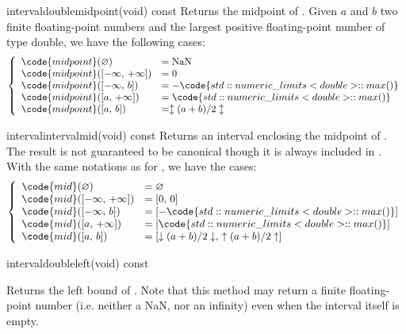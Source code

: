 \documentclass{manual}
\newcommand{\itv}[2]{\ensuremath{[#1,\,#2]}}
\newcommand{\roundDn}[1]{\ensuremath{\downarrow#1\downarrow}}
\newcommand{\roundUp}[1]{\ensuremath{\uparrow#1\uparrow}}
\newcommand{\roundNearest}[1]{\ensuremath{\updownarrow#1\updownarrow}}
\let\emptyset=\varnothing
\begin{document}
\begin{defmethod}{interval}{double}{midpoint}{(void) const}
  Returns the midpoint of . Given $a$ and $b$ two finite
  floating-point numbers and  the largest positive
  floating-point number of type double, we have the following cases:
\begin{equation*}
\left\{\begin{array}{ll}
\code{midpoint}(\emptyset{})&=\text{NaN}\\
\code{midpoint}(\itv{-\infty}{+\infty})&=0\\
\code{midpoint}(\itv{-\infty}{b})&=-\code{std::numeric\_limits<double>::max()}\\
\code{midpoint}(\itv{a}{+\infty})&=\code{std::numeric\_limits<double>::max()}\\
\code{midpoint}(\itv{a}{b})&=\roundNearest{(a+b)/2} \\
\end{array}\right.
\end{equation*}
\end{defmethod}

\begin{defmethod}{interval}{interval}{mid}{(void) const}
  Returns an interval enclosing the midpoint of . The result is not
  guaranteed to be canonical though it is always included in .
  With the same notations as for , we have the cases:
\begin{equation*}
\left\{\begin{array}{ll}
\code{mid}(\emptyset{})&=\emptyset{}\\
\code{mid}(\itv{-\infty}{+\infty})&=\itv{0}{0}\\
\code{mid}(\itv{-\infty}{b})&=[-\code{std::numeric\_limits<double>::max()}]\\
\code{mid}(\itv{a}{+\infty})&=[\code{std::numeric\_limits<double>::max()}]\\
\code{mid}(\itv{a}{b})&=\itv{\roundDn{(a+b)/2}}{\roundUp{(a+b)/2}}
\end{array}\right.
\end{equation*}
\end{defmethod}

\begin{defmethod}{interval}{double}{left}{(void) const}
  \begin{operation}
    \op{$\code{left}(\itv{x}{y})=x$}
  \end{operation}
  Returns the left bound of . Note that this method may return a finite
  floating-point number (i.e. neither a NaN, nor an infinity) even when the
  interval itself is empty.
\end{defmethod}
\end{document}
